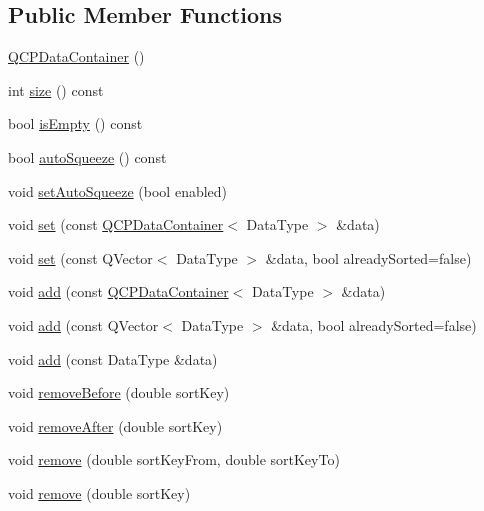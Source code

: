 \subsection*{Public Member Functions}
\begin{DoxyCompactItemize}
\item 
\hyperlink{class_q_c_p_data_container_af86c0c63719f92c360ff67cc06c6fe6f}{Q\+C\+P\+Data\+Container} ()
\item 
int \hyperlink{class_q_c_p_data_container_a8e9b262c739672e13472d0d45b720258}{size} () const
\item 
bool \hyperlink{class_q_c_p_data_container_a7bdebfccd2f9f84bf032882f9d6b00a8}{is\+Empty} () const
\item 
bool \hyperlink{class_q_c_p_data_container_a64f0f1621ca46de2352eaf87476db9b1}{auto\+Squeeze} () const
\item 
void \hyperlink{class_q_c_p_data_container_a233f866760a78950d2a393c1a4bc54b5}{set\+Auto\+Squeeze} (bool enabled)
\item 
void \hyperlink{class_q_c_p_data_container_ae7042bd534fc3ce7befa2ce3f790b5bf}{set} (const \hyperlink{class_q_c_p_data_container}{Q\+C\+P\+Data\+Container}$<$ Data\+Type $>$ \&data)
\item 
void \hyperlink{class_q_c_p_data_container_aff99fffbb26597a354c4bc8312596ab2}{set} (const Q\+Vector$<$ Data\+Type $>$ \&data, bool already\+Sorted=false)
\item 
void \hyperlink{class_q_c_p_data_container_a42b98bd994307ccd163a43d576f91ad9}{add} (const \hyperlink{class_q_c_p_data_container}{Q\+C\+P\+Data\+Container}$<$ Data\+Type $>$ \&data)
\item 
void \hyperlink{class_q_c_p_data_container_a51d2a4c9ce4baf5e950b767d26673972}{add} (const Q\+Vector$<$ Data\+Type $>$ \&data, bool already\+Sorted=false)
\item 
void \hyperlink{class_q_c_p_data_container_a715e8e9972466804954a2f8fbd5288b7}{add} (const Data\+Type \&data)
\item 
void \hyperlink{class_q_c_p_data_container_aa7f74cbce304b0369e1626c3798e1eda}{remove\+Before} (double sort\+Key)
\item 
void \hyperlink{class_q_c_p_data_container_abbe5d87ffc10b5aeffa5bb42cf03aa3c}{remove\+After} (double sort\+Key)
\item 
void \hyperlink{class_q_c_p_data_container_ae5f569a120648b167efa78835f12fd38}{remove} (double sort\+Key\+From, double sort\+Key\+To)
\item 
void \hyperlink{class_q_c_p_data_container_a2dbded7f0732bacf9db48fdfbbb620bc}{remove} (double sort\+Key)

\end{DoxyCompactItemize}
